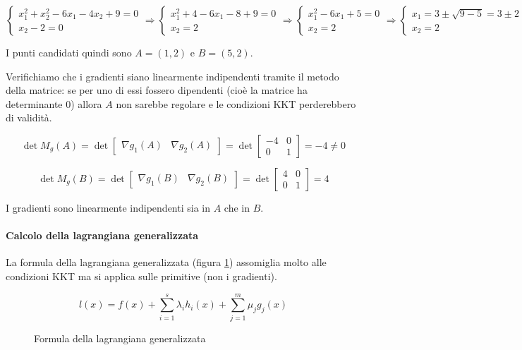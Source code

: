 \documentclass[\main/main.tex]{subfiles}
\begin{document}
\[
	\begin{cases}
		x^2_1+x^2_2-6x_1-4x_2+9  =  0 \\
		x_2-2 = 0
	\end{cases}
	\Rightarrow
	\begin{cases}
		x^2_1+4-6x_1-8+9  =  0 \\
		x_2 = 2
	\end{cases}
	\Rightarrow
	\begin{cases}
		x^2_1-6x_1+5  =  0 \\
		x_2 = 2
	\end{cases}
	\Rightarrow
	\begin{cases}
		x_1 = 3 \pm \sqrt{9 - 5} = 3 \pm 2 \\
		x_2 = 2
	\end{cases}
\]

I punti candidati quindi sono $A = (1, 2)$ e $B = (5, 2)$.

Verifichiamo che i gradienti siano linearmente indipendenti tramite il metodo della matrice: se per uno di essi fossero dipendenti (cioè la matrice ha determinante 0) allora $A$ non sarebbe regolare e le condizioni KKT perderebbero di validità.

\[
	\det M_g(A) = \det\begin{bmatrix}\nabla g_1(A) & \nabla g_2(A)\end{bmatrix}= \det\begin{bmatrix}
		-4 & 0 \\
		0  & 1
	\end{bmatrix}
	= -4 \neq 0
\]

\[
	\det M_g(B) = \det\begin{bmatrix}\nabla g_1(B) & \nabla g_2(B)\end{bmatrix}= \det\begin{bmatrix}
		4 & 0 \\
		0 & 1
	\end{bmatrix}
	= 4
\]


I gradienti sono linearmente indipendenti sia in $A$ che in $B$.

\paragraph*{Calcolo della lagrangiana generalizzata}
La formula della lagrangiana generalizzata (figura \ref{lagrangiana_generalizzata}) assomiglia molto alle condizioni KKT ma si applica sulle primitive (non i gradienti).

\begin{figure}
	\[
		l(x) = f(x) + \sum_{i=1}^s \lambda_i h_i(x) + \sum_{j=1}^m \mu_j g_j(x)
	\]
	\caption{Formula della lagrangiana generalizzata}
	\label{lagrangiana_generalizzata}
\end{figure}
\end{document}

